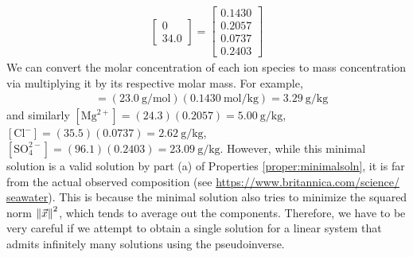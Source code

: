 \begin{solution}
\begin{align*}
\begin{bmatrix}
0 \\
34.0
\end{bmatrix}
=
\begin{bmatrix}
0.1430 \\
0.2057 \\
0.0737 \\
0.2403
\end{bmatrix}
\end{align*}
We can convert the molar concentration of each ion species to mass concentration via multiplying it by its respective molar mass. For example,
\begin{align*}
[\text{Na}^+] &= (\SI{23.0}{\g \per \mol})(\SI{0.1430}{\mol \per \kg}) = \SI{3.29}{\g \per \kg}
\end{align*}
and similarly $[\text{Mg}^{2+}] = (24.3)(0.2057) = \SI{5.00}{\g \per \kg}$, $[\text{Cl}^{-}] = (35.5)(0.0737) \allowbreak = \SI{2.62}{\g \per \kg}$, $[\text{SO}_4^{2-}] = (96.1)(0.2403) = \SI{23.09}{\g \per \kg}$. However, while this minimal solution is a valid solution by part (a) of Properties \ref{proper:minimalsoln}, it is far from the actual observed composition (see \href{https://www.britannica.com/science/seawater}{https://www.britannica.com/science/\\seawater}). This is because the minimal solution also tries to minimize the squared norm $\norm{\vec{x}}^2$, which tends to average out the components. Therefore, we have to be very careful if we attempt to obtain a single solution for a linear system that admits infinitely many solutions using the pseudoinverse.
\end{solution}

